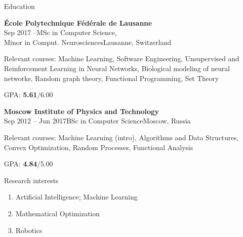 \documentclass{resume} %
\begin{document}
\begin{rSection}{Education}
\begin{rSubsection}{\bf \'Ecole Polytechnique F\'ed\'erale de Lausanne}{\\Sep 2017 --}{MSc in Computer Science,\\Minor in Comput. Neurosciences}{Lausanne, Switzerland}
\item Relevant courses: Machine Learning, Software Engineering,
{\small Unsupervised and Reinforcement Learning in Neural Networks, Biological modeling of neural networks, Random graph theory, Functional Programming, Set Theory}
\item GPA: {\bf 5.61}/6.00
\end{rSubsection}

\begin{rSubsection}{\bf Moscow Institute of Physics and Technology}{\\Sep 2012 -- Jun 2017}{BSc in Computer Science}{Moscow, Russia}
\item Relevant courses: Machine Learning (intro), Algorithms and Data Structures, Convex Optimization, Random Processes, Functional Analysis
\item GPA: {\bf 4.84}/5.00
\end{rSubsection}
\end{rSection}

\begin{rSection}{Research interests}
\begin{enumerate}
\item Artificial Intelligence; Machine Learning
\item Mathematical Optimization
\item Robotics
\end{enumerate}
\end{rSection}
\end{document}
